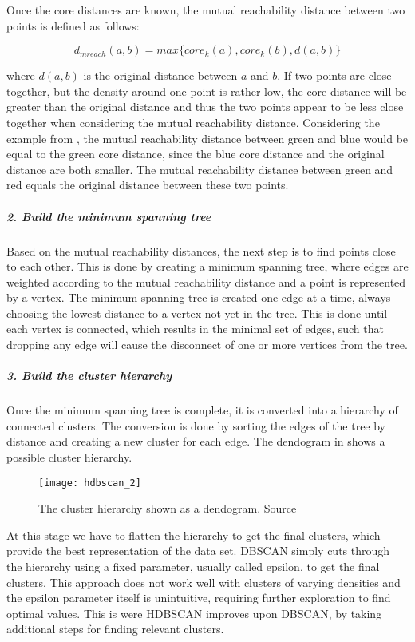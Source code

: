 Once the core distances are known, the mutual reachability distance between two points is defined as follows:

\begin{equation*}
    d_{mreach}(a, b) = max\{core_k(a), core_k(b), d(a, b)\}
\end{equation*}

where $d(a, b)$ is the original distance between $a$ and $b$.
If two points are close together, but the density around one point is rather low,
the core distance will be greater than the original distance and thus the two points appear to be less close together
when considering the mutual reachability distance. 
Considering the example from ,
the mutual reachability distance between green and blue would be equal to the green core distance, 
since the blue core distance and the original distance are both smaller. 
The mutual reachability distance between green and red equals the original distance between these two points. 

\subparagraph{2. Build the minimum spanning tree}
Based on the mutual reachability distances, the next step is to find points close to each other.
This is done by creating a minimum spanning tree,
where edges are weighted according to the mutual reachability distance and a point is represented by a vertex.
The minimum spanning tree is created one edge at a time,
always choosing the lowest distance to a vertex not yet in the tree.
This is done until each vertex is connected, which results in the minimal set of edges,
such that dropping any edge will cause the disconnect of one or more vertices from the tree.

\subparagraph{3. Build the cluster hierarchy}
Once the minimum spanning tree is complete, it is converted into a hierarchy of connected clusters.
The conversion is done by sorting the edges of the tree by distance 
and creating a new cluster for each edge. 
The dendogram in  shows a possible cluster hierarchy. 

\begin{figure}[h]
    \centering
    \texttt{[image: hdbscan\_2]}
    \caption{
        The cluster hierarchy shown as a dendogram.
        Source\cite{how_hdbscan_works}
    }
    \label{fig:hdbscan_2}
\end{figure}

At this stage we have to flatten the hierarchy to get the final clusters,
which provide the best representation of the data set.
DBSCAN simply cuts through the hierarchy using a fixed parameter, usually called epsilon, to get the final clusters.
This approach does not work well with clusters of varying densities and the epsilon parameter itself is unintuitive,
requiring further exploration to find optimal values.
This is were HDBSCAN improves upon DBSCAN, by taking additional steps for finding relevant clusters.

